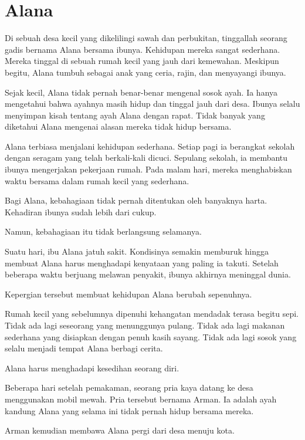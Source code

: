 \chapter*{Alana}


Di sebuah desa kecil yang dikelilingi sawah dan perbukitan, tinggallah seorang gadis bernama Alana bersama ibunya. Kehidupan mereka sangat sederhana. Mereka tinggal di sebuah rumah kecil yang jauh dari kemewahan. Meskipun begitu, Alana tumbuh sebagai anak yang ceria, rajin, dan menyayangi ibunya.

Sejak kecil, Alana tidak pernah benar-benar mengenal sosok ayah. Ia hanya mengetahui bahwa ayahnya masih hidup dan tinggal jauh dari desa. Ibunya selalu menyimpan kisah tentang ayah Alana dengan rapat. Tidak banyak yang diketahui Alana mengenai alasan mereka tidak hidup bersama.

Alana terbiasa menjalani kehidupan sederhana. Setiap pagi ia berangkat sekolah dengan seragam yang telah berkali-kali dicuci. Sepulang sekolah, ia membantu ibunya mengerjakan pekerjaan rumah. Pada malam hari, mereka menghabiskan waktu bersama dalam rumah kecil yang sederhana.

Bagi Alana, kebahagiaan tidak pernah ditentukan oleh banyaknya harta. Kehadiran ibunya sudah lebih dari cukup.

Namun, kebahagiaan itu tidak berlangsung selamanya.

Suatu hari, ibu Alana jatuh sakit. Kondisinya semakin memburuk hingga membuat Alana harus menghadapi kenyataan yang paling ia takuti. Setelah beberapa waktu berjuang melawan penyakit, ibunya akhirnya meninggal dunia.

Kepergian tersebut membuat kehidupan Alana berubah sepenuhnya.

Rumah kecil yang sebelumnya dipenuhi kehangatan mendadak terasa begitu sepi. Tidak ada lagi seseorang yang menunggunya pulang. Tidak ada lagi makanan sederhana yang disiapkan dengan penuh kasih sayang. Tidak ada lagi sosok yang selalu menjadi tempat Alana berbagi cerita.

Alana harus menghadapi kesedihan seorang diri.

Beberapa hari setelah pemakaman, seorang pria kaya datang ke desa menggunakan mobil mewah. Pria tersebut bernama Arman. Ia adalah ayah kandung Alana yang selama ini tidak pernah hidup bersama mereka.

Arman kemudian membawa Alana pergi dari desa menuju kota.


